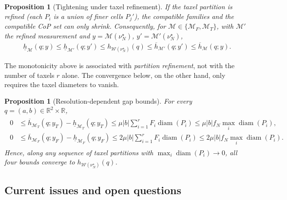 \documentclass[11pt,a4paper]{article}
\theoremstyle{plain}
\newtheorem{proposition}[theorem]{Proposition}
\begin{document}
\begin{proposition}[Tightening under taxel refinement]
\label{prop:taxel_refinement_MF}
If the taxel partition is refined (each $P_i$ is a union of finer cells $P_j'$), the compatible families and the compatible CoP set can only shrink.
Consequently, for $\mathcal M\in\{\mathcal M_F,\mathcal M_T\}$, with $\mathcal M'$ the refined measurement and $y=\mathcal M(\nu_N^\star)$, $y'=\mathcal M'(\nu_N^\star)$,
\begin{align}
\boxed{
\underline h_{\mathcal M}(q;y)
\le
\underline h_{\mathcal M'}(q;y')
\le
h_{\mathcal W(\nu_N^\star)}(q)
\le
\overline h_{\mathcal M'}(q;y')
\le
\overline h_{\mathcal M}(q;y).
}
\end{align}
\end{proposition}

The monotonicity above is associated with \textit{partition refinement}, not
with the number of taxels $r$ alone. The convergence below, on the other hand, only requires the taxel diameters to vanish.

\begin{proposition}[Resolution-dependent gap bounds]
\label{prop:taxel_resolution_MT}
For every $q=(a,b)\in\mathbb R^2\times\mathbb R$,
\begin{align}
\boxed{
\begin{aligned}
0
&\le
\overline h_{\mathcal M_T}(q;y_T)
-
\underline h_{\mathcal M_T}(q;y_T)
\le
\mu |b|
\sum_{i=1}^r
F_i\operatorname{diam}(P_i)
\le
\mu |b| f_N
\max_i\operatorname{diam}(P_i),\\
0
&\le
\overline h_{\mathcal M_F}(q;y_F)
-
\underline h_{\mathcal M_F}(q;y_F)
\le
2\mu |b|
\sum_{i=1}^r
F_i\operatorname{diam}(P_i)
\le
2\mu |b| f_N
\max_i\operatorname{diam}(P_i).
\end{aligned}
}
\end{align}
Hence, along any sequence of taxel partitions with
$\max_i\operatorname{diam}(P_i)\rightarrow0$, all four bounds converge to $h_{\mathcal W(\nu_N^\star)}(q)$.
\end{proposition}

\subsection{Current issues and open questions}
\end{document}
